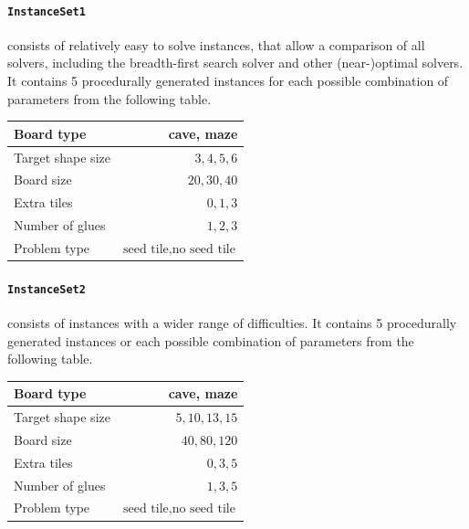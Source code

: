 \paragraph{\texttt{InstanceSet1}} consists of relatively easy to solve instances, that allow a comparison of all solvers, including the breadth-first search solver and other (near-)optimal solvers. It contains 5 procedurally generated instances for each possible combination of parameters from the following table.
\begin{center}
\begin{tabular}{ |l|r| }
\hline
Board type & cave, maze \\
\hline
Target shape size & $3 , 4, 5 , 6$ \\
\hline
Board size & $20 , 30, 40$ \\
\hline
Extra tiles & $0, 1, 3$ \\
\hline
Number of glues & $1 , 2, 3$ \\
\hline
Problem type & $\text{seed tile}, \text{no seed tile}$ \\
\hline

\end{tabular}
\end{center}

\paragraph{\texttt{InstanceSet2}} consists of instances with a wider range of difficulties. It contains 5 procedurally generated instances or each possible combination of parameters from the following table.
\begin{center}
\begin{tabular}{ |l|r| }
\hline
Board type & cave, maze \\
\hline
Target shape size & $5, 10, 13, 15$ \\
\hline
Board size & $40, 80, 120$ \\
\hline
Extra tiles & $0, 3, 5$ \\
\hline
Number of glues & $1, 3, 5$ \\
\hline
Problem type & $\text{seed tile}, \text{no seed tile}$ \\
\hline
\end{tabular}
\end{center}

